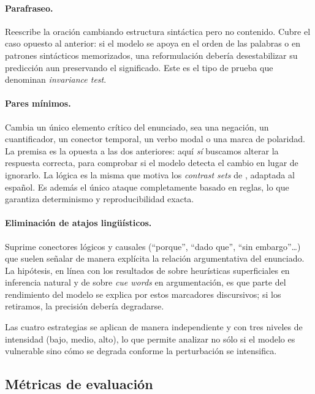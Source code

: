 \documentclass[11pt]{article}
\begin{document}
\paragraph{Parafraseo.}
Reescribe la oración cambiando estructura sintáctica pero no contenido.
Cubre el caso opuesto al anterior: si el modelo se apoya en el orden de
las palabras o en patrones sintácticos memorizados, una reformulación
debería desestabilizar su predicción aun preservando el significado.
Este es el tipo de prueba que \citet{ribeiro-etal-2020-checklist}
denominan \textit{invariance test}.

\paragraph{Pares mínimos.}
Cambia un único elemento crítico del enunciado, sea una negación, un
cuantificador, un conector temporal, un verbo modal o una marca de
polaridad. La premisa es la opuesta a las dos anteriores: aquí
\emph{sí} buscamos alterar la respuesta correcta, para comprobar si el
modelo detecta el cambio en lugar de ignorarlo. La lógica es la misma
que motiva los \textit{contrast sets} de \citet{gardner-etal-2020-evaluating},
adaptada al español. Es además el único ataque completamente basado
en reglas, lo que garantiza determinismo y reproducibilidad exacta.

\paragraph{Eliminación de atajos lingüísticos.}
Suprime conectores lógicos y causales (``porque'', ``dado que'',
``sin embargo''\ldots) que suelen señalar de manera explícita la
relación argumentativa del enunciado. La hipótesis, en línea con los
resultados de \citet{mccoy-etal-2019-right} sobre heurísticas
superficiales en inferencia natural y de
\citet{niven-kao-2019-probing} sobre \textit{cue words} en
argumentación, es que parte del rendimiento del modelo se explica por
estos marcadores discursivos; si los retiramos, la precisión debería
degradarse.

Las cuatro estrategias se aplican de manera independiente y con tres
niveles de intensidad (bajo, medio, alto), lo que permite analizar no
sólo si el modelo es vulnerable sino cómo se degrada conforme la
perturbación se intensifica.

\subsection{Métricas de evaluación}
\label{sec:metrics}
\end{document}

